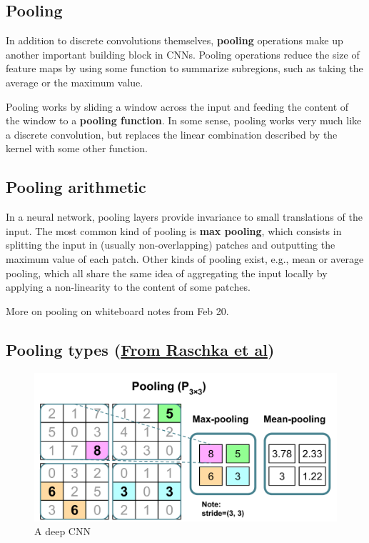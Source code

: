\documentclass[%
oneside,                 %
final,                   %
10pt]{article}
\begin{document}
\subsection{Pooling}

In addition to discrete convolutions themselves, \textbf{pooling} operations
make up another important building block in CNNs. Pooling operations reduce
the size of feature maps by using some function to summarize subregions, such
as taking the average or the maximum value.

Pooling works by sliding a window across the input and feeding the content of
the window to a \textbf{pooling function}. In some sense, pooling works very much
like a discrete convolution, but replaces the linear combination described by
the kernel with some other function.

\subsection{Pooling arithmetic}

In a neural network, pooling layers provide invariance to small translations of
the input. The most common kind of pooling is \textbf{max pooling}, which
consists in splitting the input in (usually non-overlapping) patches and
outputting the maximum value of each patch. Other kinds of pooling exist, e.g.,
mean or average pooling, which all share the same idea of aggregating the input
locally by applying a non-linearity to the content of some patches.

More on pooling on whiteboard notes from Feb 20.

\subsection{Pooling types (\href{{https://github.com/rasbt/machine-learning-book}}{From Raschka et al})}

\begin{figure}[!ht]  %
  \centerline{\includegraphics[width=0.67\linewidth]{figslides/maxpooling.png}}
  \caption{
  A deep CNN
  }
\end{figure}
\end{document}
